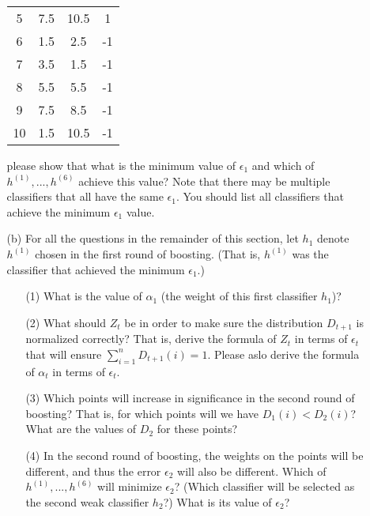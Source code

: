 \documentclass[10pt]{article}
\begin{document}
\begin{enumerate}[1.]
\begin{itemize}
\begin{table}[t]
\begin{tabular}{|c|cc|c|}
                    5 & 7.5 & 10.5 & 1 \\
                    6 & 1.5 & 2.5 & -1 \\
                    7 & 3.5 & 1.5 & -1 \\
                    8 & 5.5 & 5.5 & -1 \\
                    9 & 7.5 & 8.5 & -1 \\
                    10 & 1.5 & 10.5 & -1 \\
                    \hline
                    \end{tabular}
                \end{table}
		        please show that what is the minimum value of $\epsilon_{1}$ and which of $h^{(1)},...,h^{(6)}$ achieve this value? Note that there may be multiple classifiers that all have the same $\epsilon_{1}$. You should list all classifiers that achieve the minimum $\epsilon_{1}$ value.~\\

	        \item[(b)] For all the questions in the remainder of this section, let $h_{1}$ denote $h^{(1)}$ chosen in the first round of boosting. (That is, $h^{(1)}$ was the classifier that achieved the minimum $\epsilon_{1}$.)
		        \begin{enumerate}
			        \item[(1)] What is the value of $\alpha_{1}$ (the weight of this first classifier $h_{1}$)? ~\\

			        \item[(2)] What should $Z_{t}$ be in order to make sure the distribution $D_{t+1}$ is normalized correctly? That is, derive the formula of $Z_{t}$ in terms of $\epsilon_{t}$ that will ensure $\sum_{i=1}^{n} D_{t+1}(i) = 1$. Please aslo derive the formula of $\alpha_{t}$ in terms of $\epsilon_{t}$. ~\\

			        \item[(3)] Which points will increase in significance in the second round of boosting? That is, for which points will we have $D_{1}(i) < D_{2}(i)$? What are the values of $D_{2}$ for these points?~\\

			        \item[(4)] In the second round of boosting, the weights on the points will be different, and thus the error $\epsilon_2$ will also be different. Which of $h^{(1)}, . . . , h^{(6)}$ will minimize $\epsilon_2$? (Which classifier will be selected as the second weak classifier $h_2$?) What is its value of $\epsilon_2$?~\\


\end{enumerate}
\end{itemize}
\end{enumerate}
\end{document}

